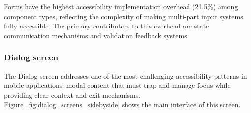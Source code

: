 Forms have the highest accessibility implementation overhead (21.5\%) among component types, reflecting the complexity of making multi-part input systems fully accessible. The primary contributors to this overhead are state communication mechanisms and validation feedback systems.

\subsubsection{Dialog screen}
\label{subsubsec:dialogs-screen}

The Dialog screen addresses one of the most challenging accessibility patterns in mobile applications: modal content that must trap and manage focus while providing clear context and exit mechanisms. Figure~\ref{fig:dialog_screens_sidebyside} shows the main interface of this screen.

